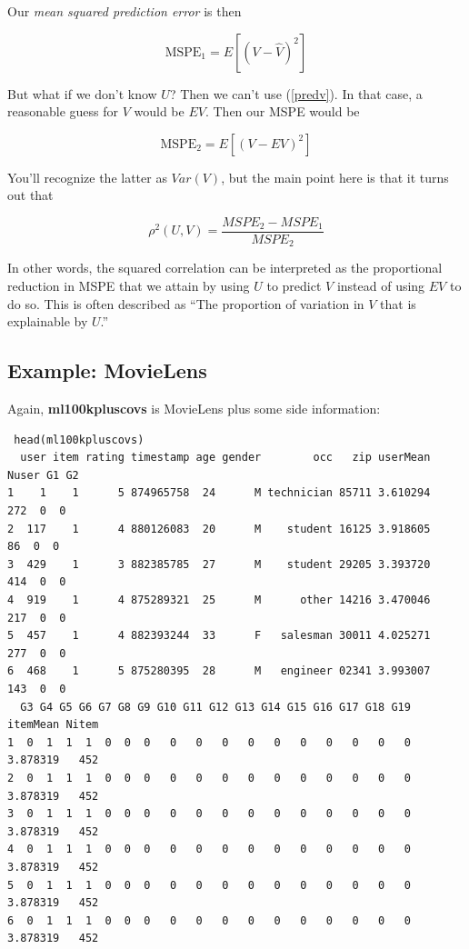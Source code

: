 Our \textit{mean squared prediction error} is then

\begin{equation}
\textrm{MSPE}_1 = E[(V - \widehat{V})^2]
\end{equation}

But what if we don't know $U$?  Then we can't use (\ref{predv}).  In
that case, a reasonable guess for $V$ would be $EV$.  Then our MSPE
would be

\begin{equation}
\textrm{MSPE}_2 = E[(V - EV)^2]
\end{equation}

You'll recognize the latter as $Var(V)$, but the main point here is that
it turns out that

\begin{equation}
\rho^2(U,V) =
\frac{MSPE_2 - MSPE_1}{MSPE_2}
\end{equation}

In other words, the squared correlation can be interpreted as the
proportional reduction in MSPE that we attain by using $U$ to predict
$V$ instead of using $EV$ to do so.  This is often described as ``The
proportion of variation in $V$ that is explainable by $U$.''

\subsection{Example:  MovieLens}

Again, \textbf{ml100kpluscovs} is MovieLens plus some side information:

\begin{lstlisting}
 head(ml100kpluscovs)
  user item rating timestamp age gender        occ   zip userMean Nuser G1 G2
1    1    1      5 874965758  24      M technician 85711 3.610294   272  0  0
2  117    1      4 880126083  20      M    student 16125 3.918605    86  0  0
3  429    1      3 882385785  27      M    student 29205 3.393720   414  0  0
4  919    1      4 875289321  25      M      other 14216 3.470046   217  0  0
5  457    1      4 882393244  33      F   salesman 30011 4.025271   277  0  0
6  468    1      5 875280395  28      M   engineer 02341 3.993007   143  0  0
  G3 G4 G5 G6 G7 G8 G9 G10 G11 G12 G13 G14 G15 G16 G17 G18 G19 itemMean Nitem
1  0  1  1  1  0  0  0   0   0   0   0   0   0   0   0   0   0 3.878319   452
2  0  1  1  1  0  0  0   0   0   0   0   0   0   0   0   0   0 3.878319   452
3  0  1  1  1  0  0  0   0   0   0   0   0   0   0   0   0   0 3.878319   452
4  0  1  1  1  0  0  0   0   0   0   0   0   0   0   0   0   0 3.878319   452
5  0  1  1  1  0  0  0   0   0   0   0   0   0   0   0   0   0 3.878319   452
6  0  1  1  1  0  0  0   0   0   0   0   0   0   0   0   0   0 3.878319   452
\end{lstlisting}

